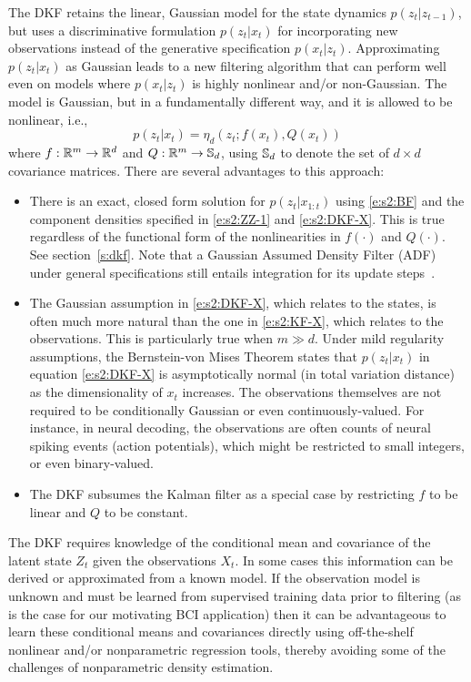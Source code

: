The DKF retains the linear, Gaussian model for the state dynamics $p(z_t|z_{t-1})$, but uses a discriminative formulation $p(z_t|x_t)$ for incorporating new observations instead of the generative specification $p(x_t|z_t)$.  Approximating $p(z_t|x_t)$ as Gaussian leads to a new filtering algorithm that can perform well even on models where $p(x_t|z_t)$ is highly nonlinear and/or non-Gaussian.  The model is Gaussian, but in a fundamentally different way, and it is allowed to be nonlinear, i.e.,
\begin{equation} 
\label{e:s2:DKF-X} p(z_t|x_t) = \eta_d(z_t;f(x_t),Q(x_t)) 
\end{equation}
where $f:\mathbb{R}^m\to\mathbb{R}^d$ and $Q:\mathbb{R}^m\to\mathbb{S}_d$, using $\mathbb{S}_d$ to denote the set of $d\!\times\!d$ covariance matrices. There are several advantages to this approach:
\begin{itemize}
\item There is an exact, closed form solution for $p(z_t|x_{1:t})$ using \eqref{e:s2:BF} and the component densities specified in \eqref{e:s2:ZZ-1} and \eqref{e:s2:DKF-X}. This is true regardless of the functional form of the nonlinearities in $f(\cdot)$ and $Q(\cdot)$. See section~\ref{s:dkf}.  Note that a Gaussian Assumed Density Filter (ADF) under general specifications still entails integration for its update steps~\cite{Ito00,Ito00b}.
\item The Gaussian assumption in \eqref{e:s2:DKF-X}, which relates to the states, is often much more natural than the one in \eqref{e:s2:KF-X}, which relates to the observations. This is particularly true when $m\gg d$.  Under mild regularity assumptions, the Bernstein-von Mises Theorem states that $p(z_t|x_t)$ in equation \eqref{e:s2:DKF-X} is asymptotically normal (in total variation distance) as the dimensionality of $x_t$ increases. The observations themselves are not required to be conditionally Gaussian or even continuously-valued. For instance, in neural decoding, the observations are often counts of neural spiking events (action potentials), which might be restricted to small integers, or even binary-valued.
\item The DKF subsumes the Kalman filter as a special case by restricting $f$ to be linear and $Q$ to be constant. 
\end{itemize}

The DKF requires knowledge of the conditional mean and covariance of the latent state $Z_t$ given the observations $X_t$.  In some cases this information can be derived or approximated from a known model. If the observation model is unknown and must be learned from supervised training data prior to filtering (as is the case for our motivating BCI application) then it can be advantageous to learn these conditional means and covariances directly using off-the-shelf nonlinear and/or nonparametric regression tools, thereby avoiding some of the challenges of nonparametric density estimation.

